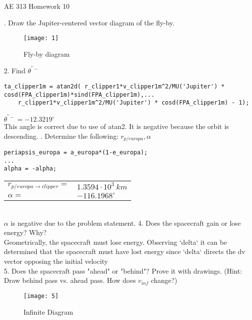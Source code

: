 \documentclass[hidelinks,12pt]{article}
\begin{document}

\begin{center}
\large AE 313 Homework 10
\end{center}
. Draw the Jupiter-centered vector diagram of the fly-by.\\
\begin{figure}[!htb]
  \center
  \texttt{[image: 1]}
  \caption{Fly-by diagram}
  \label{fig:Fig01}
\end{figure}
\vspace{10px}
2. Find $\theta^{^*-}$\\
\begin{lstlisting}[frame=lines,style=Matlab-editor,basicstyle = \mlttfamily]
ta_clipper1m = atan2d( r_clipper1*v_clipper1m^2/MU('Jupiter') * cosd(FPA_clipper1m)*sind(FPA_clipper1m),...
    r_clipper1*v_clipper1m^2/MU('Jupiter') * cosd(FPA_clipper1m) - 1);
\end{lstlisting}
$\theta^{^*-}=-12.3219^\circ$\\
This angle is correct due to use of atan2. It is negative because the orbit is descending.
\vspace{10px}
. Determine the following: $r_{p/europa}, \alpha$\\
\begin{lstlisting}[frame=lines,style=Matlab-editor,basicstyle = \mlttfamily]
periapsis_europa = a_europa*(1-e_europa);
...
alpha = -alpha;
\end{lstlisting}
\begin{tabular}{ll}
$r_{p/europa \rightarrow clipper}=$&$1.3594 \cdot 10^3~km$\\
$\alpha=$&$-116.1968^\circ$\\
\end{tabular}\\
$\alpha$ is negative due to the problem statement.
\vspace{10px}
4. Does the spacecraft gain or lose energy? Why?\\
Geometrically, the spacecraft must lose energy. Observing `delta` it can be determined that the spacecraft must have lost energy since `delta` directs the dv vector opposing the initial velocity\\
\vspace{10px}
5. Does the spacecraft pass "ahead" or "behind"? Prove it with drawings. (Hint: Draw behind pass vs. ahead pass. How does $v_{inf}$ change?)\\
\begin{figure}[!htb]
  \center
  \texttt{[image: 5]}
  \caption{Infinite Diagram}
  \label{fig:Fig02}
\end{figure}
\end{document}
